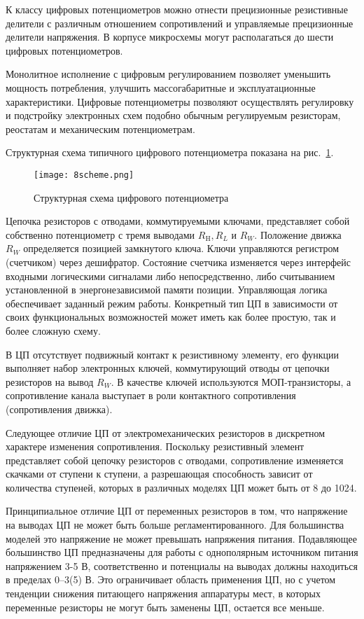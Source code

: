 К классу цифровых потенциометров можно отнести прецизионные резистивные делители с различным отношением сопротивлений и управляемые прецизионные делители напряжения. В корпусе микросхемы могут располагаться до шести цифровых потенциометров. 

Монолитное исполнение с цифровым регулированием позволяет уменьшить мощность потребления, улучшить массогабаритные и эксплуатационные характеристики. Цифровые потенциометры позволяют осуществлять регулировку и подстройку электронных схем подобно обычным регулируемым резисторам, реостатам и механическим потенциометрам. 

Структурная схема типичного цифрового потенциометра показана на рис.~\ref{pic:8scheme}.

\begin{figure}[h!]
	\begin{center}
		\texttt{[image: 8scheme.png]}
		\caption{ Структурная схема цифрового потенциометра }
		\label{pic:8scheme}
	\end{center}
\end{figure}

Цепочка резисторов с отводами, коммутируемыми ключами, представляет собой собственно потенциометр с тремя выводами $ R_\text{H}, R_L $ и $ R_W $. Положение движка $ R_W $ определяется позицией замкнутого ключа. Ключи управляются регистром (счетчиком) через дешифратор. Состояние счетчика изменяется через интерфейс входными логическими сигналами либо непосредственно, либо считыванием установленной в энергонезависимой памяти позиции. Управляющая логика обеспечивает заданный режим работы. Конкретный тип ЦП в зависимости от своих функциональных возможностей может иметь как более простую, так и более сложную схему.

В ЦП отсутствует подвижный контакт к резистивному элементу, его функции выполняет набор электронных ключей, коммутирующий отводы от цепочки резисторов на вывод $ R_W $. В качестве ключей используются МОП-транзисторы, а сопротивление канала выступает в роли контактного сопротивления (сопротивления движка). 

Следующее отличие ЦП от электромеханических резисторов в дискретном характере изменения сопротивления. Поскольку резистивный элемент представляет собой цепочку резисторов с отводами, сопротивление изменяется скачками от ступени к ступени, а разрешающая способность зависит от количества ступеней, которых в различных моделях ЦП может быть от 8 до 1024. 

Принципиальное отличие ЦП от переменных резисторов в том, что напряжение на выводах ЦП не может быть больше регламентированного. Для большинства моделей это напряжение не может превышать напряжения питания. Подавляющее большинство ЦП предназначены для работы с однополярным источником питания напряжением 3-5 В, соответственно и потенциалы на выводах должны находиться в пределах 0–3(5) В. Это ограничивает область применения ЦП, но с учетом тенденции снижения питающего напряжения аппаратуры мест, в которых переменные резисторы не могут быть заменены ЦП, остается все меньше.

